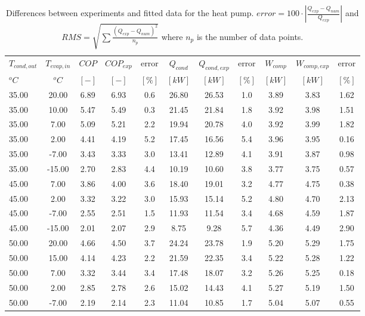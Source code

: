 \documentclass[english]{SPFShortReport}
\begin{document}
\begin{table}[!ht]
\begin{small}
\caption{Differences between experiments and fitted data for the heat pump.          $error=100 \cdot |\frac{Q_{exp}-Q_{num}}{Q_{exp}}|$ and $RMS = \sqrt { \sum{\frac{(Q_{exp}-Q_{num})^2}{n_p}} }$ where $n_p$ is the number of data points.}
\begin{center}
\resizebox{12cm}{!} 
{
\begin{tabular}{l | c c c c c c c c c c } 
\hline
\hline
$T_{cond,out}$ &$T_{evap,in}$ &$COP$ &$COP_{exp}$ &error &$Q_{cond}$ &$Q_{cond,exp}$ &error &$W_{comp}$ &$W_{comp,exp}$ &error \\ 
$^oC$ &$^oC$ &$[-]$ &$[-]$ &$[\%]$ &$[kW]$ &$[kW]$ &$[\%]$ &$[kW]$ &$[kW]$ &$[\%]$\\ 
\hline
35.00  & 20.00 & 6.89 & 6.93 & 0.6 & 26.80 & 26.53 & 1.0 & 3.89 & 3.83 & 1.62\\ 
35.00  & 10.00 & 5.47 & 5.49 & 0.3 & 21.45 & 21.84 & 1.8 & 3.92 & 3.98 & 1.51\\ 
35.00  & 7.00 & 5.09 & 5.21 & 2.2 & 19.94 & 20.78 & 4.0 & 3.92 & 3.99 & 1.82\\ 
35.00  & 2.00 & 4.41 & 4.19 & 5.2 & 17.45 & 16.56 & 5.4 & 3.96 & 3.95 & 0.16\\ 
35.00  & -7.00 & 3.43 & 3.33 & 3.0 & 13.41 & 12.89 & 4.1 & 3.91 & 3.87 & 0.98\\ 
35.00  & -15.00 & 2.70 & 2.83 & 4.4 & 10.19 & 10.60 & 3.8 & 3.77 & 3.75 & 0.57\\ 
45.00  & 7.00 & 3.86 & 4.00 & 3.6 & 18.40 & 19.01 & 3.2 & 4.77 & 4.75 & 0.38\\ 
45.00  & 2.00 & 3.32 & 3.22 & 3.0 & 15.93 & 15.14 & 5.2 & 4.80 & 4.70 & 2.13\\ 
45.00  & -7.00 & 2.55 & 2.51 & 1.5 & 11.93 & 11.54 & 3.4 & 4.68 & 4.59 & 1.87\\ 
45.00  & -15.00 & 2.01 & 2.07 & 2.9 & 8.75 & 9.28 & 5.7 & 4.36 & 4.49 & 2.90\\ 
50.00  & 20.00 & 4.66 & 4.50 & 3.7 & 24.24 & 23.78 & 1.9 & 5.20 & 5.29 & 1.75\\ 
50.00  & 15.00 & 4.14 & 4.23 & 2.2 & 21.59 & 22.35 & 3.4 & 5.22 & 5.28 & 1.22\\ 
50.00  & 7.00 & 3.32 & 3.44 & 3.4 & 17.48 & 18.07 & 3.2 & 5.26 & 5.25 & 0.18\\ 
50.00  & 2.00 & 2.85 & 2.78 & 2.6 & 15.02 & 14.43 & 4.1 & 5.27 & 5.19 & 1.50\\ 
50.00  & -7.00 & 2.19 & 2.14 & 2.3 & 11.04 & 10.85 & 1.7 & 5.04 & 5.07 & 0.55\\ 

\end{tabular}}
\end{center}
\end{small}
\end{table}
\end{document}
